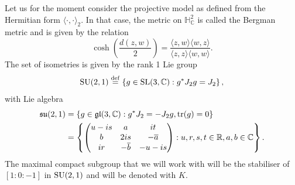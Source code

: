 \documentclass{report}
\begin{document}
Let us for the moment consider the projective model as defined from the Hermitian form $\langle \cdot, \cdot \rangle_2$.
In that case, the metric on $\mathbb H^2_{\mathbb C}$ is called the Bergman metric and is given by the relation
\[
\cosh(\frac{d(z,w)}{2}) = \frac{\langle z, w \rangle \langle w, z \rangle}{\langle z, z \rangle \langle w, w \rangle}.
\]
The set of isometries is given by the rank 1 Lie group
\[
\operatorname{{\mathrm{SU}}}(2,1) \overset{\mathrm{def}}{=} \left\{ g \in \operatorname{{\mathrm{SL}}}(3, \mathbb C) : g^* J_2 g = J_2 \right\},
\]
with Lie algebra
\begin{align*}
    \operatorname{{\mathfrak{su}}}(2,1) &= \left\{ g \in \operatorname{{\mathfrak{gl}}}(3, \mathbb C) : g^* J_2 = - J_2 g, \operatorname{tr}(g) = 0 \right\}\\
    &= \left\{ 
        \begin{pmatrix}
            u - is & a & it\\
            b & 2is & -\overline{a}\\
            ir & -\overline{b} & -u - is
        \end{pmatrix} : u,r,s,t \in \mathbb R, a, b \in \mathbb C
    \right\}.
\end{align*}
The maximal compact subgroup that we will work with will be the stabiliser of $[1:0:-1]$ in $\operatorname{{\mathrm{SU}}}(2,1)$ and will be denoted with $K$.
\end{document}
